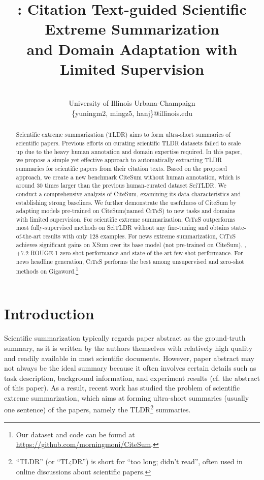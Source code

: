 \documentclass[11pt]{article}
\title{\ourdata: Citation Text-guided Scientific Extreme Summarization\\ and Domain Adaptation with Limited Supervision}
\author{\makecell{Yuning Mao, Ming Zhong, Jiawei Han} \\
University of Illinois Urbana-Champaign  \\ \{yuningm2, mingz5, hanj\}@illinois.edu 
}
\newcommand{\ours}{\textsc{CiTeS}\xspace}
\newcommand{\ourdata}{CiteSum\xspace}
\begin{document}
\maketitle
\begin{abstract}
Scientific extreme summarization (TLDR) aims to form ultra-short summaries of scientific papers.
Previous efforts on curating scientific TLDR datasets failed to scale up due to the heavy human annotation and domain expertise required.
In this paper, we propose a simple yet effective approach to automatically extracting TLDR summaries for scientific papers from their citation texts.
Based on the proposed approach, we create a new benchmark \ourdata without human annotation, which is around 30 times larger than the previous human-curated dataset SciTLDR.
We conduct a comprehensive analysis of \ourdata, examining its data characteristics and establishing strong baselines.
We further demonstrate the usefulness of \ourdata by adapting models pre-trained on \ourdata (named \ours) to new tasks and domains with limited supervision.
For scientific extreme summarization, \ours outperforms most fully-supervised methods on SciTLDR without any fine-tuning and obtains state-of-the-art results with only 128 examples.
For news extreme summarization, \ours achieves significant gains on XSum over its base model (not pre-trained on \ourdata), \eg, +7.2 ROUGE-1 zero-shot performance and state-of-the-art few-shot performance.
For news headline generation, \ours performs the best among unsupervised and zero-shot methods on Gigaword.\footnote{Our dataset and code can be found at \url{https://github.com/morningmoni/CiteSum}.}
\end{abstract}

\section{Introduction}
Scientific summarization typically regards paper abstract as the ground-truth summary, as it is written by the authors themselves with relatively high quality and readily available in most scientific documents.
However, paper abstract may not always be the ideal summary because it often involves certain details such as task description, background information, and experiment results (cf. the abstract of this paper).
As a result, recent work \cite{cachola-etal-2020-tldr} has studied the problem of scientific extreme summarization, which aims at forming ultra-short summaries (usually one sentence) of the papers, namely the TLDR\footnote{``TLDR'' (or ``TL;DR'') is short for ``too long; didn't read'', often used in online discussions about scientific papers.} summaries.
\end{document}
